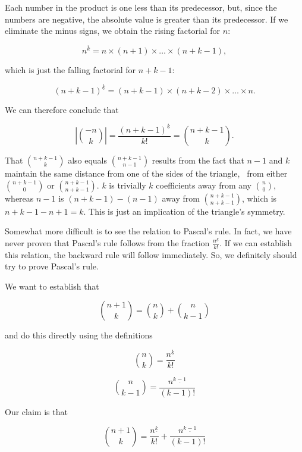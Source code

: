 \documentclass[tikz]{scrreprt}
\begin{document}
Each number in the product is one less than its predecessor,
but, since the numbers are negative, the absolute value
is greater than its predecessor.
If we eliminate the minus signs, we obtain the rising factorial
for $n$:

\[
n^{\overline{k}} = n \times (n+1) \times \dots \times (n+k-1),
\]

which is just the falling factorial for $n+k-1$:

\[
(n+k-1)^{\underline{k}} = (n+k-1) \times (n+k-2) \times \dots \times n.
\]

We can therefore conclude that

\begin{equation}
\left\lvert\binom{-n}{k}\right\rvert = 
\frac{(n+k-1)^{\underline{k}}}{k!} = \binom{n+k-1}{k}.
\end{equation}

That $\binom{n+k-1}{k}$ also equals
$\binom{n+k-1}{n-1}$ results from the fact
that $n-1$ and $k$ maintain the same distance
from one of the sides of the triangle,
\ie\ from either $\binom{n+k-1}{0}$ or $\binom{n+k-1}{n+k-1}$.
$k$ is trivially $k$ coefficients away from any $\binom{n}{0}$,
whereas $n-1$ is $(n+k-1) - (n-1)$ away from $\binom{n+k-1}{n+k-1}$,
which is $n+k-1-n+1=k$. This is just an implication
of the triangle's symmetry.

Somewhat more difficult is to see the relation to Pascal's rule.
In fact, we have never proven that Pascal's rule follows
from the fraction $\frac{n^{\underline{k}}}{k!}$.
If we can establish this relation, the backward rule
will follow immediately.
So, we definitely should try to prove Pascal's rule.

We want to establish that

\begin{equation}
\binom{n+1}{k} = \binom{n}{k} + \binom{n}{k-1}
\end{equation}

and do this directly using the definitions

\begin{equation}
\binom{n}{k} = \frac{n^{\underline{k}}}{k!}
\end{equation}

\begin{equation}
\binom{n}{k-1} = \frac{n^{\underline{k-1}}}{(k-1)!}
\end{equation}

Our claim is that

\begin{equation}\label{eq:Pascal1}
\binom{n+1}{k} = 
\frac{n^{\underline{k}}}{k!} +
\frac{n^{\underline{k-1}}}{(k-1)!}
\end{equation}
\end{document}
